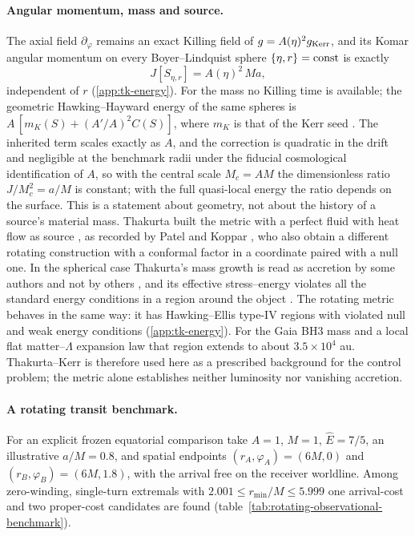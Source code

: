 \documentclass[12pt]{iopart}
\theoremstyle{plain}
\theoremstyle{definition}
\theoremstyle{remark}
\newcommand{\Ehat}{\hat E}
\begin{document}
\paragraph{Angular momentum, mass and source.}
The axial field $\partial_\varphi$ remains an exact Killing field of
$g=A(\eta)^2g_{\rm Kerr}$, and its Komar angular momentum on every
Boyer--Lindquist sphere $\{\eta,r\}={\rm const}$ is exactly
\begin{equation}
    J[S_{\eta,r}]=A(\eta)^2\,Ma ,
    \label{eq:obs-komar}
\end{equation}
independent of $r$ (\ref{app:tk-energy}). For the mass no Killing time is
available; the geometric Hawking--Hayward energy of the same spheres is
$A\,[m_K(S)+(A'/A)^2C(S)]$, where $m_K$ is that of the Kerr seed
\cite{Prain2016HH,Hammad2016HH}. The inherited term scales exactly as $A$, and the
correction is quadratic in the drift and negligible at the benchmark radii under the fiducial cosmological identification of $A$, so with
the central scale $M_c=AM$ the dimensionless ratio $J/M_c^2=a/M$ is constant; with
the full quasi-local energy the ratio depends on the surface. This is a statement
about geometry, not about the history of a source's material mass. Thakurta built
the metric with a perfect fluid with heat flow as source
\cite{Thakurta1981}, as recorded by Patel and Koppar \cite{PatelKoppar1988}, who
also obtain a different rotating construction with a conformal factor in a
coordinate paired with a null one. In the spherical case Thakurta's mass growth is
read as accretion by some authors and not by others \cite{Hutsi2021,Boehm2021},
and its effective stress--energy violates all the standard energy conditions in
a region around the object \cite{Harada2022}. The rotating metric behaves in the
same way: it has Hawking--Ellis type-IV regions with violated null and weak
energy conditions (\ref{app:tk-energy}). For the Gaia BH3 mass and a local flat
matter--$\Lambda$ expansion law that region extends to about $3.5\times10^4$ au.
Thakurta--Kerr is therefore used here as a prescribed background for the control
problem; the metric alone establishes neither luminosity nor vanishing accretion.

\paragraph{A rotating transit benchmark.}
For an explicit frozen equatorial comparison take $A=1$, $M=1$,
$\Ehat=7/5$, an illustrative $a/M=0.8$, and spatial endpoints
$(r_A,\varphi_A)=(6M,0)$ and $(r_B,\varphi_B)=(6M,1.8)$, with the arrival free on
the receiver worldline. Among zero-winding, single-turn extremals with
$2.001\le r_{\min}/M\le5.999$ one arrival-cost and two proper-cost candidates are
found (table~\ref{tab:rotating-observational-benchmark}).
\end{document}

